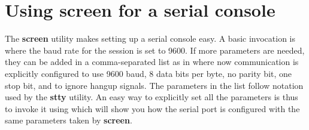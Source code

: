 \section{Using \textbf{screen} for a serial console}
The \textbf{screen} utility makes setting up a serial console easy.  A
basic invocation is
where the baud rate for the session is set to 9600\footnotemark{}.  If more
parameters are needed, they can be added in a comma-separated list as
in
where now communication is explicitly configured to use 9600 baud, 8
data bits per byte, no parity bit, one stop bit, and to ignore hangup
signals.  The parameters in the list follow notation used by the
\textbf{stty} utility.  An easy way to explicitly set all the
parameters is thus to invoke it using
which will show you how the serial port is configured with the same
parameters taken by \textbf{screen}.

